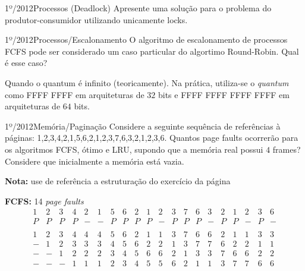 \begin{exercicio}
  {1º/2012}{Processos (Deadlock)}
  {Apresente uma solução para o problema do produtor-consumidor utilizando unicamente locks.}
\end{exercicio}

\begin{exercicio}
  {1º/2012}{Processos/Escalonamento}
  {O algoritmo de escalonamento de processos FCFS pode ser considerado um caso particular do algortimo Round-Robin. Qual é esse caso?}

  Quando o quantum é infinito (teoricamente). Na prática, utiliza-se o \textit{quantum} como FFFF FFFF em arquiteturas de $32$ bits e FFFF FFFF FFFF FFFF em arquiteturas de $64$ bits.
\end{exercicio}

\begin{exercicio}
  {1º/2012}{Memória/Paginação}
  {Considere a seguinte sequência de referências à páginas:
  1,2,3,4,2,1,5,6,2,1,2,3,7,6,3,2,1,2,3,6. \newline
  Quantos page faults ocorrerão para os algoritmos FCFS, ótimo e LRU, supondo que a memória real possui $4$ frames? Considere que inicialmente a memória está vazia.}

  \textbf{Nota:} use de referência a estruturação do exercício da página \pageref{ex:pagination-1}

  \textbf{FCFS:} 14 \textit{page faults} \\
  \[
  \begin{array}{cccccccccccccccccccc}
1 & 2 & 3 & 4 & 2 & 1 & 5 & 6 & 2 & 1 & 2 & 3 & 7 & 6 & 3 & 2 & 1 & 2 & 3 & 6 \\ \hline
P & P & P & P & - & - & P & P & P & P & - & P & P & P & - & P & P & - & P & - \\
\\
1 & 2 & 3 & 4 & 4 & 4 & 5 & 6 & 2 & 1 & 1 & 3 & 7 & 6 & 6 & 2 & 1 & 1 & 3 & 3 \\
- & 1 & 2 & 3 & 3 & 3 & 4 & 5 & 6 & 2 & 2 & 1 & 3 & 7 & 7 & 6 & 2 & 2 & 1 & 1 \\
- & - & 1 & 2 & 2 & 2 & 3 & 4 & 5 & 6 & 6 & 2 & 1 & 3 & 3 & 7 & 6 & 6 & 2 & 2 \\
- & - & - & 1 & 1 & 1 & 2 & 3 & 4 & 5 & 5 & 6 & 2 & 1 & 1 & 3 & 7 & 7 & 6 & 6 \\
  \end{array}
  \]


\end{exercicio}
